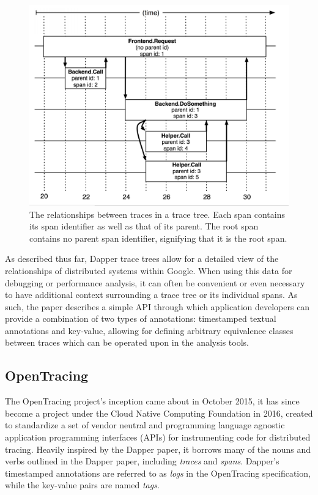 \documentclass[12pt,pdftex,titlepage]{report}
\begin{document}
                \begin{figure}[htb!]
                    \centering
                    \includegraphics[scale=1.2]{dappertrace.png}
                    \caption{The relationships between traces in a trace tree. Each span contains its span identifier as well as that of its parent. 
                    The root span contains no parent span identifier, signifying that it is the root span.}
                    \label{fig:dappertrace}
                \end{figure}

                As described thus far, Dapper trace trees allow for a detailed view of the relationships of distributed systems within
                Google. When using this data for debugging or performance analysis, it can often be convenient or even necessary to 
                have additional context surrounding a trace tree or its individual spans. As such, the paper describes a simple API 
                through which application developers can provide a combination of two types of annotations: timestamped textual annotations
                and key-value, allowing for defining arbitrary equivalence classes between traces which can be operated upon in the analysis
                tools.

            \subsection{OpenTracing}
                The OpenTracing\cite{opentracing} project's inception came about in October 2015, it has since become a project under the 
                Cloud Native Computing Foundation in 2016, created to standardize a set of vendor neutral and programming language agnostic
                application programming interfaces (APIs) for instrumenting code for distributed tracing. Heavily inspired by the Dapper
                paper, it borrows many of the nouns and verbs outlined in the Dapper paper, including \textit{traces} and \textit{spans}.
                Dapper's timestamped annotations are referred to as \textit{logs} in the OpenTracing specification, while the key-value pairs
                are named \textit{tags}. 
\end{document}
